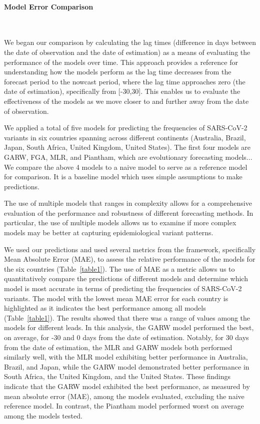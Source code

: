 \documentclass[11pt,oneside,letterpaper]{article}
\begin{document}
\paragraph{Model Error Comparison}\

We began our comparison by calculating the lag times (difference in days between the date of observation and the date of estimation) as a means of evaluating the performance of the models over time.
This approach provides a reference for understanding how the models perform as the lag time decreases from the forecast period to the nowcast period, where the lag time approaches zero (the date of estimation), specifically from [-30,30].
This enables us to evaluate the effectiveness of the models as we move closer to and further away from the date of observation.

We applied a total of five models for predicting the frequencies of SARS-CoV-2 variants in six countries spanning across different continents (Australia, Brazil, Japan, South Africa, United Kingdom, United States).
The first four models are GARW, FGA, MLR, and Piantham, which are evolutionary forecasting models... %
We compare the above 4 models to a naive model to serve as a reference model for comparison.
It is a baseline model which uses simple assumptions to make predictions. %

The use of multiple models that ranges in complexity allows for a comprehensive evaluation of the performance and robustness of different forecasting methods.
In particular, the use of multiple models allows us to examine if more complex models may be better at capturing epidemiological variant patterns. 

We used our predictions and used several metrics from the framework, specifically Mean Absolute Error (MAE), to assess the relative performance of the models for the six countries (Table~\ref{table1}).
The use of MAE as a metric allows us to quantitatively compare the predictions of different models and determine which model is most accurate in terms of predicting the frequencies of SARS-CoV-2 variants.
The model with the lowest mean MAE error for each country is highlighted as it indicates the best performance among all models (Table~\ref{table1}). 
The results showed that there was a range of values among the models for different leads.
In this analysis, the GARW model performed the best, on average, for -30 and 0 days from the date of estimation.
Notably, for 30 days from the date of estimation, the MLR and GARW models both performed similarly well, with the MLR model exhibiting better performance in Australia, Brazil, and Japan, while the GARW model demonstrated better performance in South Africa, the United Kingdom, and the United States.
These findings indicate that the GARW model exhibited the best performance, as measured by mean absolute error (MAE), among the models evaluated, excluding the naive reference model.
In contrast, the Piantham model performed worst on average among the models tested.
\end{document}
